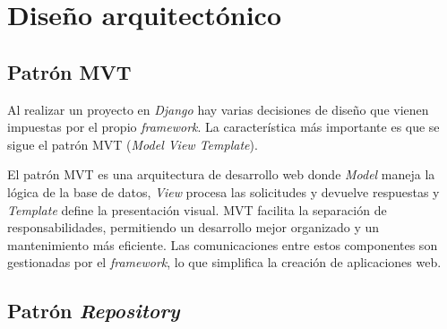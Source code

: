 \newpage









\section{Diseño arquitectónico}

\subsection{Patrón MVT}

Al realizar un proyecto en \emph{Django} hay varias decisiones de diseño que vienen impuestas por el propio \emph{framework}. La característica más importante es que se sigue el patrón MVT (\emph{Model View Template}).

El patrón MVT es una arquitectura de desarrollo web donde \emph{Model} maneja la lógica de la base de datos, \emph{View} procesa las solicitudes y devuelve respuestas y \emph{Template} define la presentación visual. MVT facilita la separación de responsabilidades, permitiendo un desarrollo mejor organizado y un mantenimiento más eficiente. Las comunicaciones entre estos componentes son gestionadas por el \emph{framework}, lo que simplifica la creación de aplicaciones web.



\subsection{Patrón \emph{Repository}}


